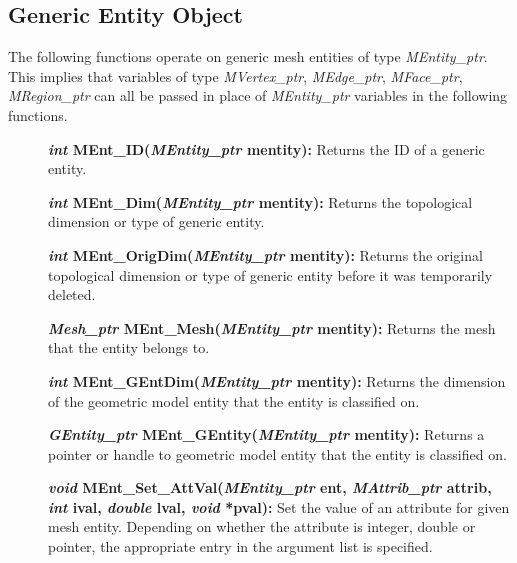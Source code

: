 \documentclass[12pt]{article}
\begin{document}
\newpage
\subsection{Generic Entity Object}

The following functions operate on generic mesh entities of type
\textit{MEntity\_ptr}. This implies that variables of type
\textit{MVertex\_ptr}, \textit{MEdge\_ptr}, \textit{MFace\_ptr},
\textit{MRegion\_ptr} can all be passed in place of
\textit{MEntity\_ptr} variables in the following functions.

\begin{description}

  
\item[]\textbf{\textit{int} MEnt\_ID(\textit{MEntity\_ptr} mentity):} Returns
the ID of a generic entity.

\item[]\textbf{\textit{int} MEnt\_Dim(\textit{MEntity\_ptr} mentity):}
Returns the topological dimension or type of generic entity.

\item[]\textbf{\textit{int} MEnt\_OrigDim(\textit{MEntity\_ptr} mentity):}
Returns the original topological dimension or type of generic entity before it
was temporarily deleted.

\item[]\textbf{\textit{Mesh\_ptr} MEnt\_Mesh(\textit{MEntity\_ptr} mentity):}
Returns the mesh that the entity belongs to.

\item[]\textbf{\textit{int} MEnt\_GEntDim(\textit{MEntity\_ptr}
    mentity):} Returns the dimension of the geometric model entity
  that the entity is classified on.
  
\item[]\textbf{\textit{GEntity\_ptr}
    MEnt\_GEntity(\textit{MEntity\_ptr} mentity):} Returns a pointer
  or handle to geometric model entity that the entity is classified
  on.

\item[]
  
\item[]\textbf{\textit{void} MEnt\_Set\_AttVal(\textit{MEntity\_ptr}
    ent, \textit{MAttrib\_ptr} attrib, \textit{int} ival,
    \textit{double} lval, \textit{void} *pval):} Set the value of an
  attribute for given mesh entity. Depending on whether the attribute
  is integer, double or pointer, the appropriate entry in the argument
  list is specified.
    

\end{description}
\end{document}
